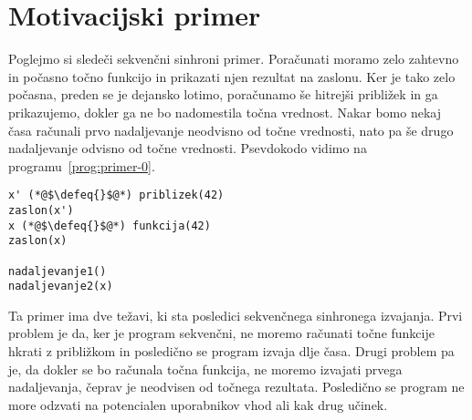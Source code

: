 \section{Motivacijski primer} \label{sec:primeri-aeff}

Poglejmo si sledeči sekvenčni sinhroni primer. Poračunati moramo zelo zahtevno in počasno točno funkcijo in prikazati njen rezultat na zaslonu. Ker je tako zelo počasna, preden se je dejansko lotimo, poračunamo še hitrejši približek in ga prikazujemo, dokler ga ne bo nadomestila točna vrednost. Nakar bomo nekaj časa računali prvo nadaljevanje neodvisno od točne vrednosti, nato pa še drugo nadaljevanje odvisno od točne vrednosti. Psevdokodo vidimo na programu~\ref{prog:primer-0}.

\begin{lstlisting}[caption={Sinhron sekvečni primer.},label={prog:primer-0},float,floatplacement=H]
x' (*@$\defeq{}$@*) priblizek(42)
zaslon(x')
x (*@$\defeq{}$@*) funkcija(42)
zaslon(x)

nadaljevanje1()
nadaljevanje2(x)
\end{lstlisting}

Ta primer ima dve težavi, ki sta posledici sekvenčnega sinhronega izvajanja. Prvi problem je da, ker je program sekvenčni, ne moremo računati točne funkcije hkrati z približkom in posledično se program izvaja dlje časa. Drugi problem pa je, da dokler se bo računala točna funkcija, ne moremo izvajati prvega nadaljevanja, čeprav je neodvisen od točnega rezultata. Posledično se program ne more odzvati na potencialen uporabnikov vhod ali kak drug učinek.  

